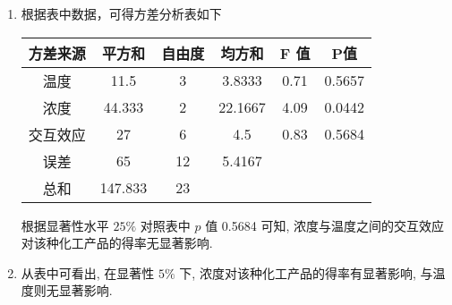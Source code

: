 \begin{enumerate}[(1)]
    \item 根据表中数据，可得方差分析表如下
    \begin{center}
    \begin{tabular}{c|c|c|cc|c}
    \hline
    方差来源 & 平方和     & 自由度 & \multicolumn{1}{c|}{均方和}     & F 值  & P值     \\ \hline
    温度   & 11.5    & 3   & \multicolumn{1}{c|}{3.8333}  & 0.71 & 0.5657 \\
    浓度   & 44.333  & 2   & \multicolumn{1}{c|}{22.1667} & 4.09 & 0.0442 \\
    交互效应 & 27      & 6   & \multicolumn{1}{c|}{4.5}     & 0.83 & 0.5684 \\
    误差   & 65      & 12  & \multicolumn{1}{c|}{5.4167}  &      &        \\ \hline
    总和   & 147.833 & 23  &                              &      &        \\ \hline
    \end{tabular}
    \end{center}
根据显著性水平 $25\%$ 对照表中 $p$ 值 0.5684 可知, 浓度与温度之间的交互效应对该种化工产品的得率无显著影响. 
\item 从表中可看出, 在显著性 $5\%$ 下, 浓度对该种化工产品的得率有显著影响, 与温度则无显著影响.
\end{enumerate}

\vspace{12pt}

